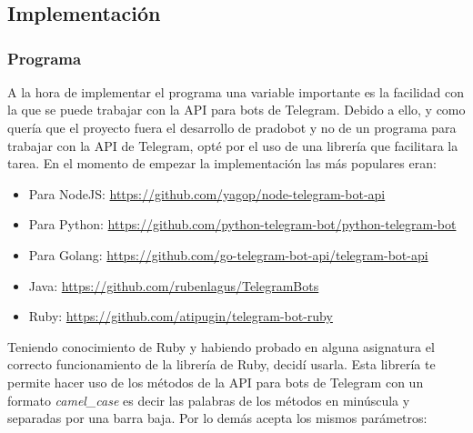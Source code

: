\chapter{}

\section{Implementación}

\subsection{Programa}
A la hora de implementar el programa una variable importante es la facilidad con la que se puede trabajar con la API para bots de Telegram. Debido a ello, y como quería que el proyecto fuera el desarrollo de pradobot y no de un programa para trabajar con la API de Telegram, opté por el uso de una librería que facilitara la tarea. En el momento de empezar la implementación las más populares eran:


\begin{itemize}
\item Para NodeJS: \url{https://github.com/yagop/node-telegram-bot-api}
\item Para Python: \url{https://github.com/python-telegram-bot/python-telegram-bot}
\item Para Golang: \url{https://github.com/go-telegram-bot-api/telegram-bot-api}
\item Java: \url{https://github.com/rubenlagus/TelegramBots}
\item Ruby: \url{https://github.com/atipugin/telegram-bot-ruby}
\end{itemize}

Teniendo conocimiento de Ruby y habiendo probado en alguna asignatura el correcto funcionamiento de la librería de Ruby, decidí usarla. Esta librería te permite hacer uso de los métodos de la API para bots de Telegram con un formato \textit{camel\_case} es decir las palabras de los métodos en minúscula y separadas por una barra baja. Por lo demás acepta los mismos parámetros:



